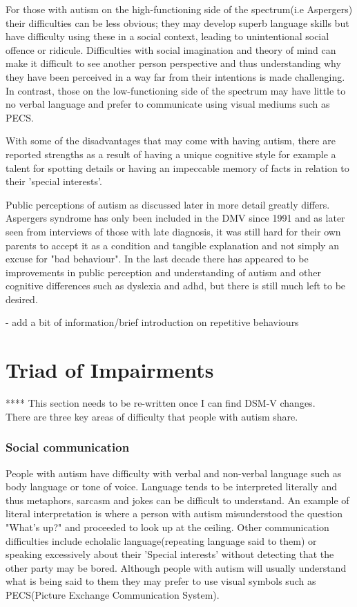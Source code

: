 \documentclass[11pt]{report}
\begin{document}
For those with autism on the high-functioning side of the spectrum(i.e Aspergers) their difficulties can be less obvious; they may develop superb language skills but have difficulty using these in a social context, leading to unintentional social offence or ridicule. Difficulties with social imagination and theory of mind can make it difficult to see another person perspective and thus understanding why they have been perceived in a way far from their intentions is made challenging. In contrast, those on the low-functioning side of the spectrum may have little to no verbal language and prefer to communicate using visual mediums such as PECS. 

With some of the disadvantages that may come with having autism, there are reported strengths as a result of having a unique cognitive style for example a talent for spotting details\cite{bayes} or having an impeccable memory of facts in relation to their 'special interests'. 

Public perceptions of autism as discussed later in more detail greatly differs. Aspergers syndrome has only been included in the DMV since 1991 and as later seen from interviews of those with late diagnosis, it was still hard for their own parents to accept it as a condition and tangible explanation and not simply an excuse for "bad behaviour". In the last decade there has appeared to be improvements in public perception and understanding of autism and other cognitive differences such as dyslexia and adhd, but there is still much left to be desired. 

- add a bit of information/brief introduction on repetitive behaviours


\section{Triad of Impairments}

**** This section needs to be re-written once I can find DSM-V changes. \\

There are three key areas of difficulty that people with autism share.

\subsubsection*{Social communication}
People with autism have difficulty with verbal and non-verbal language such as body language or tone of voice. Language tends to be interpreted literally and thus metaphors, sarcasm and jokes can be difficult to understand\cite{nas}. An example of literal interpretation is where a person with autism misunderstood the question "What's up?" and proceeded to look up at the ceiling. Other communication difficulties include echolalic language(repeating language said to them) or speaking excessively about their 'Special interests' without detecting that the other party may be bored\cite{nas}. Although people with autism will usually understand what is being said to them they may prefer to use visual symbols such as PECS(Picture Exchange Communication System). 
\end{document}
